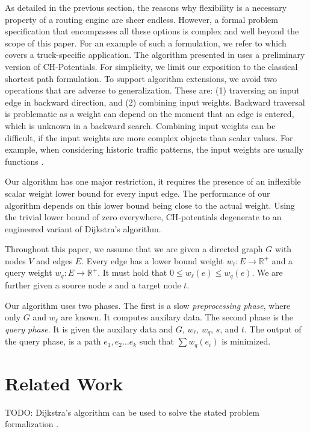\documentclass[a4paper,UKenglish,cleveref, autoref]{lipics-v2019}
\begin{document}
As detailed in the previous section, the reasons why flexibility is a necessary property of a routing engine are sheer endless.
However, a formal problem specification that encompasses all these options is complex and well beyond the scope of this paper.
For an example of such a formulation, we refer to \cite{sea2020paper} which covers a truck-specific application.
The algorithm presented in \cite{sea2020paper} uses a preliminary version of CH-Potentials.
For simplicity, we limit our exposition to the classical shortest path formulation.
To support algorithm extensions, we avoid two operations that are adverse to generalization.
These are:
(1) traversing an input edge in backward direction, and
(2) combining input weights.
Backward traversal is problematic as a weight can depend on the moment that an edge is entered, which is unknown in a backward search.
Combining input weights can be difficult, if the input weights are more complex objects than scalar values.
For example, when considering historic traffic patterns, the input weights are usually functions \cite{citation needed}.

Our algorithm has one major restriction, it requires the presence of an inflexible scalar weight lower bound for every input edge.
The performance of our algorithm depends on this lower bound being close to the actual weight.
Using the trivial lower bound of zero everywhere, CH-potentials degenerate to an engineered variant of Dijkstra's algorithm.

Throughout this paper, we assume that we are given a directed graph $G$ with nodes $V$ and edges $E$.
Every edge has a lower bound weight $w_\ell:E\rightarrow \mathbb{R}^+$ and a query weight $w_q:E\rightarrow \mathbb{R}^+$.
It must hold that $0\le w_\ell(e)\le w_q(e)$.
We are further given a source node $s$ and a target node $t$.

Our algorithm uses two phases.
The first is a slow \emph{preprocessing phase}, where only $G$ and $w_\ell$ are known.
It computes auxilary data.
The second phase is the \emph{query phase}.
It is given the auxilary data and $G$, $w_\ell$, $w_q$, $s$, and $t$.
The output of the query phase, is a path $e_1,e_2\ldots e_k$ such that $\sum w_q(e_i)$ is minimized.

\section{Related Work}

TODO: Dijkstra's algorithm \cite{Dijkstra's} can be used to solve the stated problem formalization \cite{Veit?}.
\end{document}
